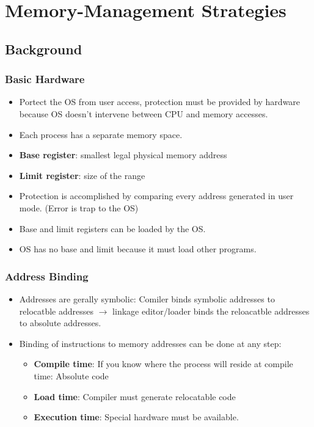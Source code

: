 \documentclass[10pt]{report}
\begin{document}
\chapter{Memory-Management Strategies} \label{ch:Chapter8}
	\section{Background}
		\subsection{Basic Hardware}
			\begin{itemize}
				\item Portect the OS from user access, protection must be provided by hardware because OS doesn't intervene between CPU and memory accesses.
				\item Each process has a separate memory space.
				\item \textbf{Base register}: smallest legal physical memory address
				\item \textbf{Limit register}: size of the range
				\item Protection is accomplished by comparing every address generated in user mode. (Error is trap to the OS)
				\item Base and limit registers can be loaded by the OS.
				\item OS has no base and limit because it must load other programs.
			\end{itemize}

		\subsection{Address Binding}
			\begin{itemize}
				\item Addresses are gerally symbolic: Comiler binds symbolic addresses to relocatble addresses $\rightarrow$ linkage editor/loader binds the reloacatble addresses to absolute addresses.
				\item Binding of instructions to memory addresses can be done at any step:
				\begin{itemize}
					\item \textbf{Compile time}: If you know where the process will reside at compile time: Absolute code
					\item \textbf{Load time}: Compiler must generate relocatable code
					\item \textbf{Execution time}: Special hardware must be available.
				\end{itemize}
			\end{itemize}
\end{document}
